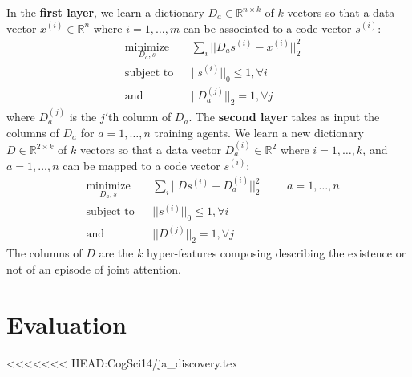 \documentclass[10pt,letterpaper]{article}
\begin{document}
In the {\bf first layer}, we learn a dictionary $D_{a} \in \mathbb{R}^{n \times k}$ of $k$ vectors so that a data vector $x^{(i)} \in \mathbb{R}^{n}$ where $i =1, \dots, m$ can be associated to a code vector $s^{(i)}$:
\begin{equation*}
\begin{aligned}
& \underset{D_{a},s}{\text{minimize}}
& &\sum_{i} ||D_{a}s^{(i)} - x^{(i)}||_{2}^{2}\\
& \text{subject to}
& & ||s^{(i)}||_{0} \leq 1, \forall i \\
& \text{and}
& & ||D_{a}^{(j)}||_{2} = 1, \forall j %
\end{aligned}
\end{equation*}
where $D_{a}^{(j)}$ is the $j'$th column of $D_{a}$. The {\bf second layer} takes as input the columns of $D_a$ for $a=1,\dots, n$ training agents. We learn a new dictionary $D \in \mathbb{R}^{2  \times k}$ of $k$ vectors so that a data vector $D_{a}^{(i)} \in \mathbb{R}^{2}$ where $i =1, \dots, k$, and  $a =1, \dots, n$ can be mapped to a code vector $s^{(i)}$:
\begin{equation*}
\begin{aligned}
& \underset{D_{a},s}{\text{minimize}}
& &\sum_{i} ||Ds^{(i)} - D_{a}^{(i)}||_{2}^{2}
&  & & a = 1,\dots, n\\
& \text{subject to}
& & ||s^{(i)}||_{0} \leq 1, \forall i \\%
& \text{and}
& & ||D^{(j)}||_{2} = 1, \forall j %
\end{aligned}
\end{equation*}
The columns of $D$ are the $k$ hyper-features composing describing the existence or not of an episode of joint attention.



\section{Evaluation}
<<<<<<< HEAD:CogSci14/ja_discovery.tex
\end{document}
